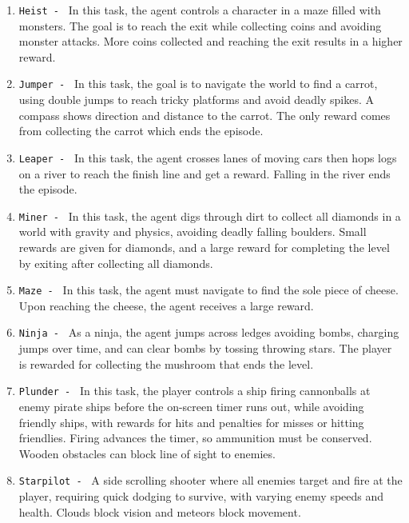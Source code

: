 \begin{enumerate}
    \item \texttt{Heist - } In this task, the agent controls a character in a maze filled with monsters. The goal is to reach the exit while collecting coins and avoiding monster attacks. More coins collected and reaching the exit results in a higher reward.
    
    \item \texttt{Jumper - } In this task, the goal is to navigate the world to find a carrot, using double jumps to reach tricky platforms and avoid deadly spikes. A compass shows direction and distance to the carrot. The only reward comes from collecting the carrot which ends the episode.
    
    \item \texttt{Leaper - } In this task, the agent crosses lanes of moving cars then hops logs on a river to reach the finish line and get a reward. Falling in the river ends the episode.
    
    \item \texttt{Miner - } In this task, the agent digs through dirt to collect all diamonds in a world with gravity and physics, avoiding deadly falling boulders. Small rewards are given for diamonds, and a large reward for completing the level by exiting after collecting all diamonds.
    
    \item \texttt{Maze - } In this task, the agent must navigate to find the sole piece of cheese. Upon reaching the cheese, the agent receives a large reward. 
    
    \item \texttt{Ninja - } As a ninja, the agent jumps across ledges avoiding bombs, charging jumps over time, and can clear bombs by tossing throwing stars. The player is rewarded for collecting the mushroom that ends the level.
    
    \item \texttt{Plunder - } In this task, the player controls a ship firing cannonballs at enemy pirate ships before the on-screen timer runs out, while avoiding friendly ships, with rewards for hits and penalties for misses or hitting friendlies. Firing advances the timer, so ammunition must be conserved. Wooden obstacles can block line of sight to enemies.
    
    \item \texttt{Starpilot - } A side scrolling shooter where all enemies target and fire at the player, requiring quick dodging to survive, with varying enemy speeds and health. Clouds block vision and meteors block movement.
\end{enumerate}

